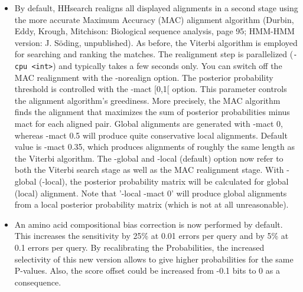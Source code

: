 \documentclass[11pt,a4paper]{article}
\begin{document}
\begin{itemize}

\item{By default, HHsearch realigns all displayed alignments in a second stage 
  using the more accurate Maximum Accuracy (MAC) alignment algorithm 
  (Durbin, Eddy, Krough, Mitchison: Biological sequence analysis, page 95;
  HMM-HMM version: J. S\"oding, unpublished). As before, the Viterbi algorithm 
  is employed for searching and ranking the matches. The realignment step is 
  parallelized (\verb`-cpu <int>`) and typically takes a few seconds only. You can 
  switch off the MAC realignment with the -norealign option. 
     The posterior probability threshold is controlled with the -mact [0,1[ 
  option. This parameter controls the alignment algorithm's greediness. More 
  precisely, the MAC algorithm finds the alignment that maximizes the sum of 
  posterior probabilities minus mact for each aligned pair. Global alignments 
  are generated with -mact 0, whereas -mact 0.5 will produce quite conservative
  local alignments. Default value is -mact 0.35, which produces alignments of
  roughly the same length as the Viterbi algorithm. 
     The -global and -local (default) option now refer to both the Viterbi search 
  stage as well as the MAC realignment stage. With -global (-local), the 
  posterior probability matrix will be calculated for global (local) 
  alignment. Note that '-local -mact 0' will produce global alignments from
  a local posterior probability matrix (which is not at all unreasonable).
}
\item{An amino acid compositional bias correction is now performed by default.
  This increases the sensitivity by 25\% at 0.01 errors per query and by 5\% at 
  0.1 errors per query. By recalibrating the Probabilities, the increased 
  selectivity of this new version allows to give higher probabilities for the 
  same P-values. Also, the score offset could be increased from -0.1 bits to 0 
  as a consequence. 
}


\end{itemize}
\end{document}
